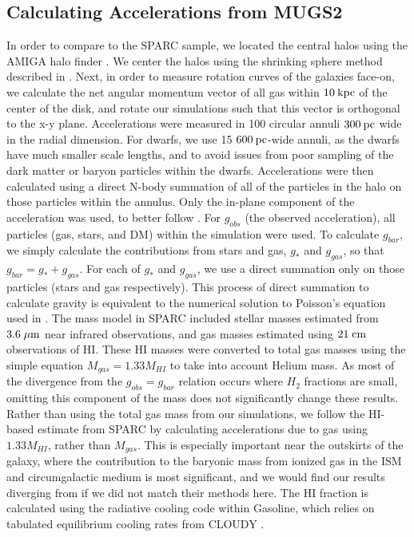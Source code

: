 \subsection{Calculating Accelerations from MUGS2}
In order to compare to the SPARC sample, we located the central halos using the
AMIGA halo finder \citep{Knollmann2009}.  We center the halos using the
shrinking sphere method described in \citet{Power2003}.  Next, in order to
measure rotation curves of the galaxies face-on, we calculate the net angular
momentum vector of all gas within $10\>{\rm kpc}$ of the center of the disk, and rotate
our simulations such that this vector is orthogonal to the x-y plane.
Accelerations were measured in 100 circular annuli $300\>{\rm pc}$ wide in the radial
dimension.  For dwarfs, we use 15 $600\>{\rm pc}$-wide annuli, as the dwarfs have much
smaller scale lengths, and to avoid issues from poor sampling of the dark matter
or baryon particles within the dwarfs.  Accelerations were then calculated using
a direct N-body summation of all of the particles in the halo on those particles
within the annulus.  Only the in-plane component of the acceleration was used,
to better follow \citet{McGaugh2016}.  For $g_{obs}$ (the observed
acceleration), all particles (gas, stars, and DM) within the simulation were
used.  To calculate $g_{bar}$, we simply calculate the contributions from stars
and gas, $g_*$ and $g_{gas}$, so that $g_{bar}=g_*+g_{gas}$.  For each of $g_*$
and $g_{gas}$, we use a direct summation only on those particles (stars and gas
respectively).  This process of direct summation to calculate gravity is
equivalent to the numerical solution to Poisson's equation used in
\citet{McGaugh2016}.  The mass model in SPARC \citep{Lelli2016b} included
stellar masses estimated from $3.6\;\mu\rm{m}$ near infrared observations, and
gas masses estimated using $21\;\rm{cm}$ observations of {\sc HI}.  These {\sc
HI} masses were converted to total gas masses using the simple equation
$M_{gas}=1.33M_{HI}$ to take into account Helium mass.  As most of the
divergence from the $g_{obs}=g_{bar}$ relation occurs where $H_2$ fractions are
small, omitting this component of the mass does not significantly change these
results. Rather than using the
total gas mass from our simulations, we follow the {\sc HI}-based estimate from
SPARC by calculating accelerations due to gas using $1.33M_{HI}$, rather than
$M_{gas}$.  This is especially important near the outskirts of the galaxy, where
the contribution to the baryonic mass from ionized gas in the ISM and
circumgalactic medium is most significant, and we would find our results
diverging from \citet{McGaugh2016} if we did not match their methods here.  The
HI fraction is calculated using the radiative cooling code within {\sc
Gasoline}, which relies on tabulated equilibrium cooling rates from {\sc CLOUDY}
\citep{Ferland2013}.

